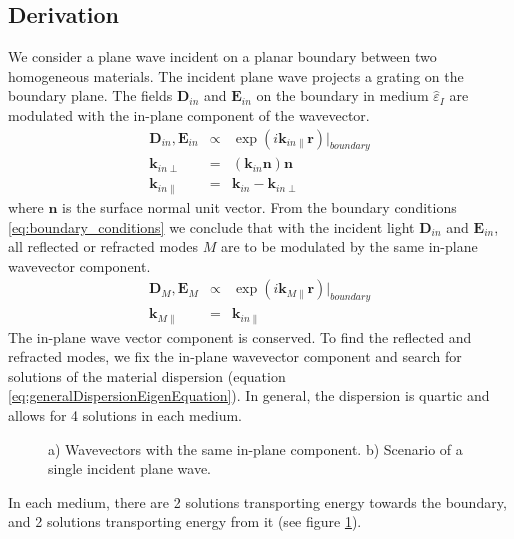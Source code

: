 \documentclass[12pt,a4paper,twoside,openright,BCOR10mm,headsepline,titlepage,abstracton,chapterprefix,final]{scrreprt}
\newcommand\Vector[1]{{\mathbf{#1}}}
\newcommand\Location{\Vector{r}}
\newcommand\wavenumber{k}
\newcommand\Wavevector{\Vector{\wavenumber}}
\newcommand\Tensor[1]{\hat{#1}}
\newcommand\scalarEfield{E}
\newcommand\scalarDfield{D}
\newcommand\Efield{\Vector{\scalarEfield}}
\newcommand\Dfield{\Vector{\scalarDfield}}
\newcommand\permittivity{\Tensor{\scalarpermittivity}}
\newcommand\scalarpermittivity{\varepsilon}
\newcommand\materialone{I}
\begin{document}
\subsection{Derivation}
We consider a plane wave incident on a planar boundary between two homogeneous materials.
The incident plane wave projects a grating on the boundary plane. 
The fields $\Dfield_{in}$ and $\Efield_{in}$ on the boundary in medium $\permittivity_\materialone$ are modulated with the in-plane component of the wavevector. 
\begin{eqnarray}
 \Dfield_{in}, \Efield_{in} &\propto& \exp( i \Wavevector_{in\parallel} \Location)|_{boundary} \\
 \Wavevector_{in\perp} &=& ( \Wavevector_{in} \Vector{n} ) \Vector{n} \\
 \Wavevector_{in\parallel} &=& \Wavevector_{in} - \Wavevector_{in\perp}
\end{eqnarray}
where $\Vector{n}$ is the surface normal unit vector.
From the boundary conditions \ref{eq:boundary_conditions} we conclude that with the incident light $\Dfield_{in}$ and $\Efield_{in}$, 
all reflected or refracted modes $M$ are to be modulated by the same in-plane wavevector component.
\begin{eqnarray}
  \Dfield_{M}, \Efield_{M} &\propto& \exp( i \Wavevector_{M\parallel} \Location)|_{boundary} \\
  \Wavevector_{M\parallel} &=& \Wavevector_{in\parallel}
\end{eqnarray}
The in-plane wave vector component is conserved.
To find the reflected and refracted modes, 
we fix the in-plane wavevector component and search for solutions of the material dispersion
(equation \ref{eq:generalDispersionEigenEquation}).
In general, the dispersion is quartic and allows for 4 solutions in each medium.
\begin{figure}
  \centering
  \caption{a) Wavevectors with the same in-plane component.
           b) Scenario of a single incident plane wave.}
  \label{fig:boundary_wavevectors}
\end{figure}
In each medium, there are 2 solutions transporting energy towards the boundary, 
and 2 solutions transporting energy from it (see figure \ref{fig:boundary_wavevectors}).
\end{document}

